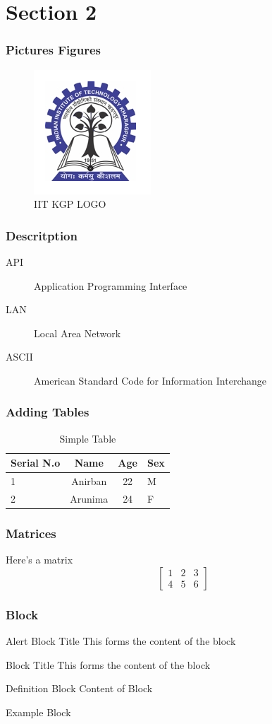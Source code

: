 \documentclass{beamer}
\begin{document}
	\section{Section 2}
	\begin{frame}
		\frametitle{Pictures Figures}
		\begin{figure}
			\includegraphics[scale=1.2]{images/kgplogo}
			\caption{IIT KGP LOGO}
		\end{figure}
	\end{frame}
	\begin{frame}
		\frametitle{Descritption}
		\begin{description}
			\item[API] Application Programming Interface
			\item[LAN] Local Area Network
			\item[ASCII] American Standard Code for Information Interchange
		\end{description}
	\end{frame}
	\begin{frame}
		\frametitle{Adding Tables}
		\begin{table}[h]
			\begin{tabular}{l | c | c | l}
				Serial N.o & Name & Age & Sex \\
				\hline
				1 & Anirban & 22 & M \\
				\hline
				2 & Arunima & 24 & F
			\end{tabular}
			\caption{Simple Table}
			\label{tab:tri}
		\end{table}
	\end{frame}
	\begin{frame}
		\frametitle {Matrices}
		Here's a matrix \\
		\[
		\begin{bmatrix}
		1 & 2 & 3 \\
		4 & 5 & 6
		\end{bmatrix}
		\]
	\end{frame}
	\begin{frame}
		\frametitle{Block}
		\begin{alertblock}{Alert Block Title}
			This forms the content of the block
		\end{alertblock}
		\begin{block}{Block Title}
			This forms the content of the block
		\end{block}
		\begin{definition}{Definition Block}
			Content of Block
		\end{definition}
		\begin{example}
			Example Block
		\end{example}
	\end{frame}
	
\end{document}
